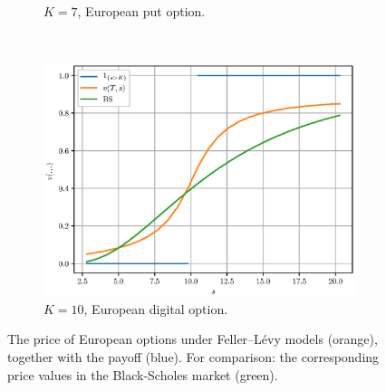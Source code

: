 \begin{figure}[h]
\begin{subfigure}{0.5\textwidth}
  \caption{$K= 7$, European put option.}
  \label{fig:sub2}
\end{subfigure} \\
\begin{subfigure}{0.5\textwidth}
  \centering
  \includegraphics[width=1\linewidth]{figures/pricing/digital_modi.eps}
  \caption{$K=10$, European digital option.}
  \label{fig:sub1}
\end{subfigure}%
\caption{The price of European options under Feller--L\'{e}vy models (orange), together with the payoff (blue). For comparison: the corresponding price values in the Black-Scholes market (green).}
\label{fig:sub2}
\end{figure}


\newpage
